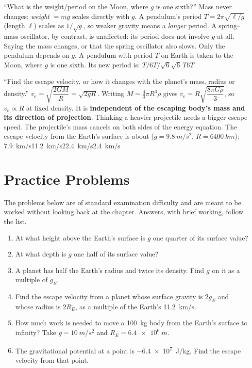 {``What is the weight/period on the Moon, where $g$ is one sixth?''}
{Mass never changes; \emph{weight} $=mg$ scales directly with $g$. A pendulum's period
$T=2\pi\sqrt{\ell/g}$ (length $\ell$) scales as $1/\sqrt g$, so weaker gravity means a \emph{longer} period. A
spring--mass oscillator, by contrast, is unaffected: its period does not involve $g$ at all.}
{Saying the mass changes, or that the spring oscillator also slows. Only the pendulum depends on $g$.}
{A pendulum with period $T$ on Earth is taken to the Moon, where $g$ is one sixth. Its new period is:}
{$T/6$}{$T/\sqrt6$}{$\sqrt6\,T$}{$6T$}

{``Find the escape velocity, or how it changes with the planet's mass, radius or density.''}
{$v_e=\sqrt{\dfrac{2GM}{R}}=\sqrt{2gR}$. Writing $M=\tfrac{4}{3}\pi R^3\rho$ gives
$v_e=R\sqrt{\dfrac{8\pi G\rho}{3}}$, so $v_e\propto R$ at fixed density. It is
\textbf{independent of the escaping body's mass and its direction of projection}.}
{Thinking a heavier projectile needs a bigger escape speed. The projectile's mass cancels on both sides
of the energy equation.}
{The escape velocity from the Earth's surface is about ($g=\SI{9.8}{m/s^2}$, $R=\SI{6400}{km}$):}
{\SI{7.9}{km/s}}{\SI{11.2}{km/s}}{\SI{22.4}{km/s}}{\SI{2.4}{km/s}}

\section{Practice Problems}\label{sec:practice16}

The problems below are of standard examination difficulty and are meant to be worked without looking back at the chapter. Answers, with brief working, follow the list.

\begin{enumerate}[itemsep=3pt]
\item At what height above the Earth's surface is $g$ one quarter of its surface value?
\item At what depth is $g$ one half of its surface value?
\item A planet has half the Earth's radius and twice its density. Find $g$ on it as a multiple of
      $g_E$.
\item Find the escape velocity from a planet whose surface gravity is $2g_E$ and whose radius is
      $2R_E$, as a multiple of the Earth's \SI{11.2}{km/s}.
\item How much work is needed to move a \SI{100}{kg} body from the Earth's surface to infinity? Take
      $g=\SI{10}{m/s^2}$ and $R_E=\SI{6.4e6}{m}$.
\item The gravitational potential at a point is \SI{-6.4e7}{J/kg}. Find the escape velocity from that
      point.
\end{enumerate}

